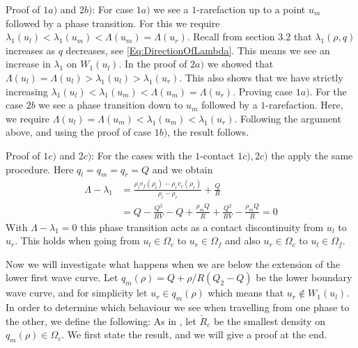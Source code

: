 \documentclass[10pt]{article}
\numberwithin{equation}{section}
\begin{document}
\begin{enumerate}
Proof of $1a)$ and $2b)$: \newline
For case $1a)$ we see a $1$-rarefaction up to a point $u_m$ followed by a phase transition. For this we require $\lambda_1(u_l) < \lambda_1(u_m) < \Lambda(u_m) = \Lambda(u_r)$. Recall from section $3.2$ that $\lambda_1(\rho,q)$ increases as $q$ decreases, see \ref{Eq:DirectionOfLambda}. This means we see an increase in $\lambda_1$ on $W_1(u_l)$. In the proof of $2a)$ we showed that $\Lambda(u_l) = \Lambda(u_l) > \lambda_1(u_l) > \lambda_1(u_r) $. This also shows that we have strictly increasing $\lambda_1(u_l) < \lambda_1(u_m) < \Lambda(u_m) = \Lambda(u_r)$. Proving case $1a)$. 
For the case $2b$ we see a phase transition down to $u_m$ followed by a $1$-rarefaction.  Here, we require $\Lambda(u_l) = \Lambda(u_m) < \lambda_1(u_m) < \lambda_1(u_r)$. Following the argument above, and using the proof of case $1b)$, the result follows. 

Proof of $1c)$ and $2c)$: \newline
For the cases with the $1$-contact $1c),2c)$ the apply the same procedure. Here $q_l = q_m = q_r = Q$ and we obtain
\begin{align*}
    \Lambda - \lambda_1 &= \frac{\rho_l v_f(\rho_l) - \rho_r v_c(\rho_r)}{\rho_l - \rho_r} + \frac{Q}{R} \\
    &= Q - \frac{Q^2}{RV} - Q + \frac{\rho_m Q}{R} + \frac{Q^2}{RV} -  \frac{\rho_m Q}{R} = 0 
\end{align*}
With $\Lambda - \lambda_1 = 0 $ this phase transition acts as a contact discontinuity from $u_l$ to $u_r$. This holds when going from $u_l \in \Omega_c$ to $u_r \in \Omega_f$ and also $u_r \in \Omega_c$ to $u_l \in \Omega_f$.

Now we will investigate what happens when we are below the extension of the lower first wave curve. Let $q_m(\rho) = Q + \rho/R(Q_2 - Q)$ be the lower boundary wave curve, and for simplicity let $u_r \in q_m(\rho)$ which means that $u_r \notin W_1(u_l)$.
In order to determine which behaviour we see when travelling from one phase to the other, we define the following: As in \cite{Colombo2002}, let $\check R_c$ be the smallest density on $q_m(\rho) \in \Omega_c$. We first state the result, and we will give a proof at the end. 


\end{enumerate}
\end{document}
